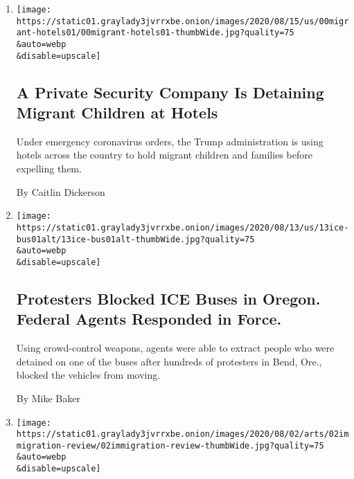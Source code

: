 \begin{enumerate}
\def\labelenumi{\arabic{enumi}.}
\item
  \href{/2020/08/16/us/migrant-children-hotels-coronavirus.html}{}

  \texttt{[image: https://static01.graylady3jvrrxbe.onion/images/2020/08/15/us/00migrant-hotels01/00migrant-hotels01-thumbWide.jpg?quality=75\\\&auto=webp\\\&disable=upscale]}

  \hypertarget{a-private-security-company-is-detaining-migrant-children-at-hotels}{%
  \subsection{A Private Security Company Is Detaining Migrant Children
  at
  Hotels}\label{a-private-security-company-is-detaining-migrant-children-at-hotels}}

  Under emergency coronavirus orders, the Trump administration is using
  hotels across the country to hold migrant children and families before
  expelling them.

  By Caitlin Dickerson
\item
  \href{/2020/08/13/us/ICE-bus-protesters-Bend-Oregon.html}{}

  \texttt{[image: https://static01.graylady3jvrrxbe.onion/images/2020/08/13/us/13ice-bus01alt/13ice-bus01alt-thumbWide.jpg?quality=75\\\&auto=webp\\\&disable=upscale]}

  \hypertarget{protesters-blocked-ice-buses-in-oregon-federal-agents-responded-in-force}{%
  \subsection{Protesters Blocked ICE Buses in Oregon. Federal Agents
  Responded in
  Force.}\label{protesters-blocked-ice-buses-in-oregon-federal-agents-responded-in-force}}

  Using crowd-control weapons, agents were able to extract people who
  were detained on one of the buses after hundreds of protesters in
  Bend, Ore., blocked the vehicles from moving.

  By Mike Baker
\item
  \href{/2020/08/02/arts/television/immigration-nation-review-netflix.html}{}

  \texttt{[image: https://static01.graylady3jvrrxbe.onion/images/2020/08/02/arts/02immigration-review/02immigration-review-thumbWide.jpg?quality=75\\\&auto=webp\\\&disable=upscale]}

  \hypertarget{immigration-nation-review-the-banality-of-deportation}{%
}
\end{enumerate}
